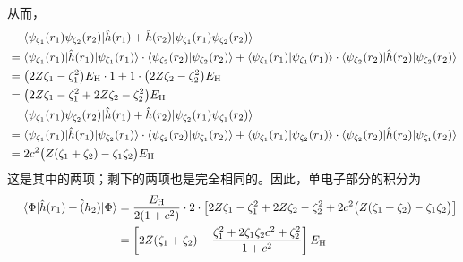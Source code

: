 从而，
\begin{align}
    &\quad\ \langle \psi_{\zeta_1} (r_1) \psi_{\zeta_2} (r_2) | \hat h (r_1) + \hat h (r_2) | \psi_{\zeta_1} (r_1) \psi_{\zeta_2} (r_2) \rangle \\
    &= \langle \psi_{\zeta_1} (r_1) | \hat h (r_1) | \psi_{\zeta_1} (r_1) \rangle \cdot \langle \psi_{\zeta_2} (r_2) | \psi_{\zeta_2} (r_2) \rangle
    + \langle \psi_{\zeta_1} (r_1) | \psi_{\zeta_1} (r_1) \rangle \cdot \langle \psi_{\zeta_2} (r_2) | \hat h (r_2) | \psi_{\zeta_2} (r_2) \rangle \notag\\
    &= \big( 2 Z \zeta_1 - \zeta_1^2 \big) E_\mathrm{H} \cdot 1 + 1 \cdot \big( 2 Z \zeta_2 - \zeta_2^2 \big) E_\mathrm{H} \notag\\
    &= \big( 2 Z \zeta_1 - \zeta_1^2 + 2 Z \zeta_2 - \zeta_2^2 \big) E_\mathrm{H} \\
    &\quad\ \langle \psi_{\zeta_1} (r_1) \psi_{\zeta_2} (r_2) | \hat h (r_1) + \hat h (r_2) | \psi_{\zeta_2} (r_1) \psi_{\zeta_1} (r_2) \rangle \\
    &= \langle \psi_{\zeta_1} (r_1) | \hat h (r_1) | \psi_{\zeta_2} (r_1) \rangle \cdot \langle \psi_{\zeta_2} (r_2) | \psi_{\zeta_1} (r_2) \rangle
    + \langle \psi_{\zeta_1} (r_1) | \psi_{\zeta_2} (r_1) \rangle \cdot \langle \psi_{\zeta_2} (r_2) | \hat h (r_2) | \psi_{\zeta_1} (r_2) \rangle \notag\\
    &= 2 c^2 \big( Z (\zeta_1 + \zeta_2) - \zeta_1 \zeta_2 \big) E_\mathrm{H}
\end{align}
这是其中的两项；剩下的两项也是完全相同的。因此，单电子部分的积分为%
\begin{align}
    \quad\ \langle \Phi | \hat h (r_1) + \hat (h_2) | \Phi \rangle 
    &= \frac{E_\mathrm{H}}{2 (1+c^2)} \cdot 2 \cdot \left[ 2 Z \zeta_1 - \zeta_1^2 + 2 Z \zeta_2 - \zeta_2^2 + 2 c^2 \big( Z (\zeta_1 + \zeta_2) - \zeta_1 \zeta_2 \big) \right] \notag\\
    &= \left[ 2 Z (\zeta_1 + \zeta_2) - \frac{\zeta_1^2 + 2 \zeta_1 \zeta_2 c^2 + \zeta_2^2}{1 + c^2} \right] E_\mathrm{H}
\end{align}





